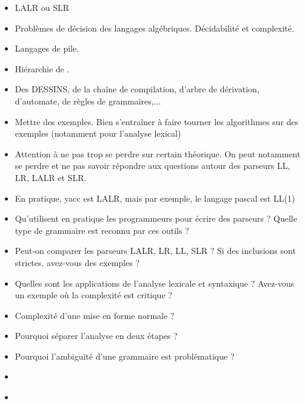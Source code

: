 \documentclass{agregfiche}
\begin{document}
\secidees

\begin{itemize}
	\item LALR ou SLR
    \item Problèmes de décision des langages algébriques. Décidabilité et complexité.
    \item Langages de pile.
    \item Hiérarchie de .
\end{itemize}

\secpieges

\begin{itemize}
    \item Des DESSINS, de la chaîne de compilation, d'arbre de dérivation, d'automate, de règles de grammaires,...
    \item Mettre des exemples. Bien s'entraîner à faire tourner les algorithmes sur des exemples (notamment pour l'analyse lexical)
	\item Attention à ne pas trop se perdre sur certain théorique. On peut notamment se perdre et ne pas savoir répondre aux questions autour des parseurs LL, LR, LALR et SLR. 
    \item En pratique, yacc est LALR, mais par exemple, le langage pascal est LL(1)

\end{itemize}

\secquestionsclassiques

\begin{itemize}
	\item Qu'utilisent en pratique les programmeurs pour écrire des parseurs ? Quelle type de grammaire est reconnu par ces outils ?
\item Peut-on comparer les parseurs LALR, LR, LL, SLR ? Si  des inclusions sont strictes, avez-vous des exemples ?
\item Quelles sont les applications de l'analyse lexicale et syntaxique ? Avez-vous un exemple où la complexité est critique ?
\item Complexité d'une mise en forme normale ?
\item Pourquoi séparer l'analyse en deux étapes ?
\item Pourquoi l'ambiguïté d'une grammaire est problématique ?
\end{itemize}

\secreferences

\begin{itemize}
\item 
\end{itemize}

\secdev

\begin{itemize}
\item 
\end{itemize}
\end{document}
